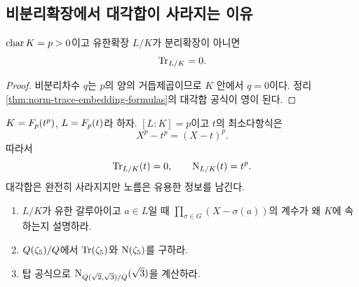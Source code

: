 \subsection{비분리확장에서 대각합이 사라지는 이유}

\begin{corollary}
\label{cor:inseparable-trace-zero}
$\operatorname{char} K=p>0$이고 유한확장 $L/K$가 분리확장이 아니면
\[
  \operatorname{Tr}_{L/K}=0.
\]
\end{corollary}

\begin{proof}
비분리차수 $q$는 $p$의 양의 거듭제곱이므로 $K$ 안에서 $q=0$이다.
정리 \ref{thm:norm-trace-embedding-formulas}의 대각합 공식이 영이 된다.
\end{proof}

\begin{example}[순수비분리확장]
$K=F_p(t^p)$, $L=F_p(t)$라 하자. $[L:K]=p$이고
$t$의 최소다항식은
\[
  X^p-t^p=(X-t)^p.
\]
따라서
\[
  \operatorname{Tr}_{L/K}(t)=0,
  \qquad
  \operatorname{N}_{L/K}(t)=t^p.
\]
대각합은 완전히 사라지지만 노름은 유용한 정보를 남긴다.
\end{example}

\begin{checkpoint}
\begin{enumerate}[label=(\alph*)]
  \item $L/K$가 유한 갈루아이고 $a\in L$일 때
  $\prod_{\sigma\in G}(X-\sigma(a))$의 계수가 왜 $K$에 속하는지 설명하라.
  \item $Q(\zeta_5)/Q$에서
  $\operatorname{Tr}(\zeta_5)$와 $\operatorname{N}(\zeta_5)$를 구하라.
  \item 탑 공식으로
  $\operatorname{N}_{Q(\sqrt2,\sqrt3)/Q}(\sqrt3)$을 계산하라.
\end{enumerate}
\end{checkpoint}
